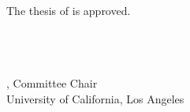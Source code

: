 \newpage
The thesis of  is approved.

\begin{center}
\\
\\
\\
, Committee Chair\\[50pt]

University of California, Los Angeles\\
\end{center}